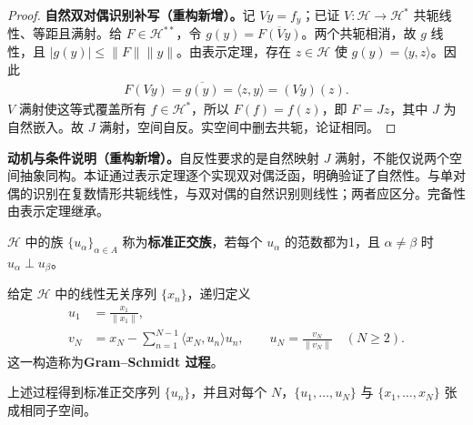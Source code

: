 \documentclass[../../main.tex]{subfiles}
\begin{document}
\begin{proof}
\textbf{自然双对偶识别补写（重构新增）。}记 $Vy=f_y$；已证 $V:\mathscr H\to\mathscr H^*$ 共轭线性、等距且满射。给 $F\in\mathscr H^{**}$，令 $g(y)=\overline{F(Vy)}$。两个共轭相消，故 $g$ 线性，且 $|g(y)|\leqslant\|F\|\|y\|$。由表示定理，存在 $z\in\mathscr H$ 使 $g(y)=\langle y,z\rangle$。因此
\begin{align*}
F(Vy)=\overline{g(y)}=\langle z,y\rangle=(Vy)(z).
\end{align*}
$V$ 满射使这等式覆盖所有 $f\in\mathscr H^*$，所以 $F(f)=f(z)$，即 $F=Jz$，其中 $J$ 为自然嵌入。故 $J$ 满射，空间自反。实空间中删去共轭，论证相同。
\end{proof}
\begin{remark}
\textbf{动机与条件说明（重构新增）。}自反性要求的是自然映射 $J$ 满射，不能仅说两个空间抽象同构。本证通过表示定理逐个实现双对偶泛函，明确验证了自然性。与单对偶的识别在复数情形共轭线性，与双对偶的自然识别则线性；两者应区分。完备性由表示定理继承。
\end{remark}
\begin{definition}[标准正交族]\label{definition:ch05-orthonormal}
$\mathscr H$ 中的族 $\{u_\alpha\}_{\alpha\in A}$ 称为\textbf{标准正交族}，若每个 $u_\alpha$ 的范数都为1，且 $\alpha\ne\beta$ 时 $u_\alpha\perp u_\beta$。
\end{definition}
\begin{definition}\label{definition:ch05-gram-schmidt}
给定 $\mathscr H$ 中的线性无关序列 $\{x_n\}$，递归定义
\begin{align*}
u_1&=\frac{x_1}{\|x_1\|},\\
v_N&=x_N-\sum_{n=1}^{N-1}\langle x_N,u_n\rangle u_n,
\qquad u_N=\frac{v_N}{\|v_N\|}\quad(N\geqslant2).
\end{align*}
这一构造称为\textbf{Gram--Schmidt 过程}。
\end{definition}
\begin{proposition}\label{proposition:ch05-gram-schmidt}
上述过程得到标准正交序列 $\{u_n\}$，并且对每个 $N$，$\{u_1,\ldots,u_N\}$ 与 $\{x_1,\ldots,x_N\}$ 张成相同子空间。
\end{proposition}
\end{document}
